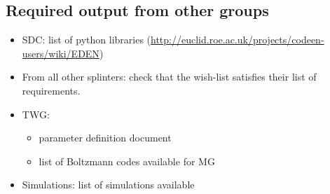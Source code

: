 \subsection{Required output from other groups}
\begin{itemize}
 \item SDC: list of python libraries (\url{http://euclid.roe.ac.uk/projects/codeen-users/wiki/EDEN}) 
 \item From all other splinters: check that the wish-list satisfies their list of requirements. 
 \item TWG:
 \begin{itemize}
  \item parameter definition document
  \item list of Boltzmann codes available for MG
 \end{itemize}
 \item Simulations: list of simulations available
\end{itemize}





%



